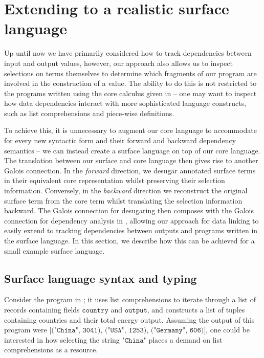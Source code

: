 \newpage
\section{Extending to a realistic surface language}
\label{sec:surface-language}

Up until now we have primarily considered how to track dependencies between input and output values, however, our approach also allows us to inspect selections on terms themselves to determine which fragments of our program are involved in the construction of a value. The ability to do this is not restricted to the programs written using the core calculus given in  -- one may want to inspect how data dependencies interact with more sophisticated language constructs, such as list comprehensions and piece-wise definitions.

To achieve this, it is unnecessary to augment our core language to accommodate for every new syntactic form and their forward and backward dependency semantics -- we can instead create a surface language on top of our core language. The translation between our surface and core language then gives rise to another Galois connection. In the \textit{forward} direction, we desugar annotated surface terms in their equivalent core representation whilst preserving their selection information. Conversely, in the \textit{backward} direction we reconstruct the original surface term from the core term whilst translating the selection information backward. The Galois connection for desugaring then composes with the Galois connection for dependency analysis in , allowing our approach for data linking to easily extend to tracking dependencies between outputs and programs written in the surface language. In this section, we describe how this can be achieved for a small example surface language.



\subsection{Surface language syntax and typing}

Consider the program in ; it uses list comprehensions to iterate through a list of records containing fields $\texttt{country}$ and $\texttt{output}$, and constructs a list of tuples containing countries and their total energy output. Assuming the output of this program were $\texttt{[("China", 3041), ("USA", 1253),}$ $\texttt{("Germany", 606)]}$, one could be interested in how selecting the string $\texttt{"China"}$ places a demand on list comprehensions as a resource.

